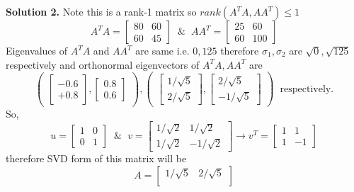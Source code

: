\documentclass[a4paper,11pt]{article}
\numberwithin{equation}{section}
\begin{document}
\begin{itemize}
\textbf{Solution 2.} Note this is a rank-1 matrix so $rank(A^TA,AA^T)\leq 1$
\[
A^TA=\begin{bmatrix}
    80&60\\60&45
\end{bmatrix} \hspace{7pt} \& \hspace{7pt} AA^T=\begin{bmatrix}
    25&60\\60&100
\end{bmatrix}
\]
Eigenvalues of $A^TA$ and $AA^T$ are same i.e. $0,125$ therefore $\sigma_1,\sigma_2$ are $\sqrt{0},\sqrt{125}$ respectively and orthonormal eigenvectors of
$A^TA,AA^T$  are 
\[\begin{pmatrix}
    \begin{bmatrix}
        -0.6\\+0.8
    \end{bmatrix},\begin{bmatrix}
        0.8\\0.6
    \end{bmatrix}
\end{pmatrix},\begin{pmatrix}
    \begin{bmatrix}
        1/\sqrt{5}\\2/\sqrt{5}
    \end{bmatrix},\begin{bmatrix}
        2/\sqrt{5}\\-1/\sqrt{5}
    \end{bmatrix}
\end{pmatrix} \hspace{7pt} \text{respectively.}
\] So,
\[u=\begin{bmatrix}
    1&0\\0&1
\end{bmatrix} \hspace{7pt} \& \hspace{7pt} v=
    \begin{bmatrix}
        {1}/{\sqrt{2}}&{1}/{\sqrt{2}}\\
        {1}/{\sqrt{2}}&-{1}/{\sqrt{2}}
    \end{bmatrix}\longrightarrow v^T=\begin{bmatrix}
        1&1\\
        1&-1
    \end{bmatrix}
\]
therefore SVD form of this matrix will be 
\[
A=\begin{bmatrix}
    1/\sqrt{5}&2/\sqrt{5}\\

\end{bmatrix}\]
\end{itemize}
\end{document}
